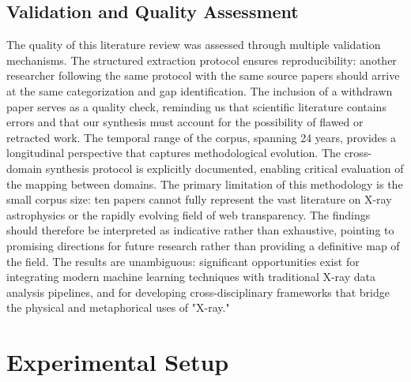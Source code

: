 \documentclass[conference]{IEEEtran}
\begin{document}
\subsection{Validation and Quality Assessment}

The quality of this literature review was assessed through multiple validation mechanisms. The structured extraction protocol ensures reproducibility: another researcher following the same protocol with the same source papers should arrive at the same categorization and gap identification. The inclusion of a withdrawn paper serves as a quality check, reminding us that scientific literature contains errors and that our synthesis must account for the possibility of flawed or retracted work. The temporal range of the corpus, spanning 24 years, provides a longitudinal perspective that captures methodological evolution. The cross-domain synthesis protocol is explicitly documented, enabling critical evaluation of the mapping between domains. The primary limitation of this methodology is the small corpus size: ten papers cannot fully represent the vast literature on X-ray astrophysics or the rapidly evolving field of web transparency. The findings should therefore be interpreted as indicative rather than exhaustive, pointing to promising directions for future research rather than providing a definitive map of the field. The results are unambiguous: significant opportunities exist for integrating modern machine learning techniques with traditional X-ray data analysis pipelines, and for developing cross-disciplinary frameworks that bridge the physical and metaphorical uses of "X-ray."

\section{Experimental Setup}
\end{document}
